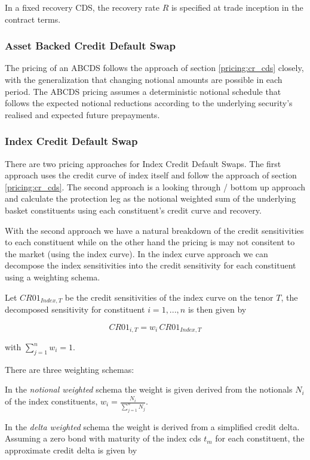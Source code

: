 In a fixed recovery CDS, the recovery rate $R$ is specified at trade inception in the 
contract terms.

\subsubsection{Asset Backed Credit Default Swap}
\label{pricing:cr_abcds}

The pricing of an ABCDS follows the approach of section \ref{pricing:cr_cds} closely,
with the generalization that changing notional amounts are possible in each period.
The ABCDS pricing assumes a deterministic notional schedule that follows the expected
notional reductions according to the underlying security's realised and expected future prepayments.

\subsubsection{Index Credit Default Swap}
\label{pricing:cr_index_cds}

There are two pricing approaches for Index Credit Default Swaps. The first approach uses the credit curve of index itself and follow the approach of section \ref{pricing:cr_cds}. 
The second approach is a looking through / bottom up approach 
and calculate the protection leg as the notional weighted sum of the underlying basket constituents using each constituent's credit curve and recovery.

With the second approach we have a natural breakdown of the 
credit sensitivities to each constituent while on the other hand the pricing is may not consitent to the market (using the index curve).
In the index curve approach we can decompose the index sensitivities into the credit sensitivity for each constituent using a
weighting schema. 

Let $CR01_{Index,T}$ be the credit sensitivities of the index curve on the tenor $T$, the decomposed sensitivity for constituent $i=1,...,n$ is 
then given by

$$ CR01_{i, T} = w_i \, CR01_{Index,T}$$

with $\sum_{j=1}^n w_i = 1$.

There are three weighting schemas:

In the \emph{notional weighted} schema the weight is given derived from the notionals $N_i$ of the index constituents, $w_i = \frac{N_i}{\sum_{j=1}^n N_j}$. 

In the \emph{delta weighted} schema the weight is derived from a simplified credit delta. Assuming a zero bond with maturity of the index cds $t_m$ for each constituent,
the approximate credit delta is given by

